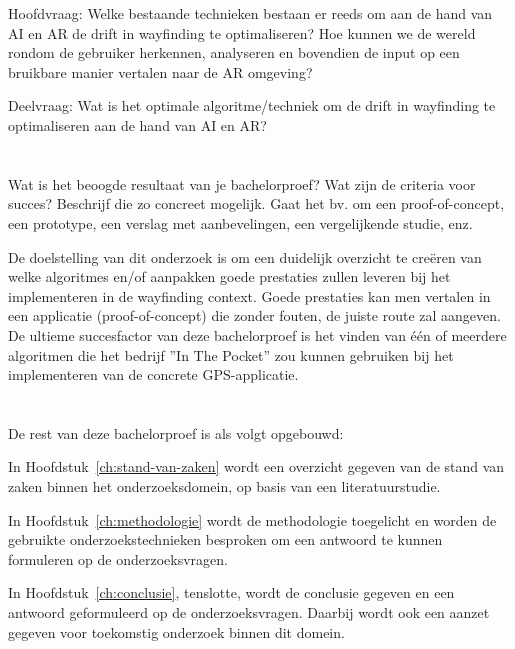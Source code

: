 Hoofdvraag: Welke bestaande technieken bestaan er reeds om aan de hand van AI en AR de drift in wayfinding te optimaliseren? Hoe kunnen we de wereld rondom de gebruiker herkennen, analyseren en bovendien de input op een bruikbare manier vertalen naar de AR omgeving?

Deelvraag: Wat is het optimale algoritme/techniek om de drift in wayfinding te optimaliseren aan de hand van AI en AR? 

\section{}
\label{sec:onderzoeksdoelstelling}

Wat is het beoogde resultaat van je bachelorproef? Wat zijn de criteria voor succes? Beschrijf die zo concreet mogelijk. Gaat het bv. om een proof-of-concept, een prototype, een verslag met aanbevelingen, een vergelijkende studie, enz.

De doelstelling van dit onderzoek is om een duidelijk overzicht te creëren van welke algoritmes en/of aanpakken goede prestaties zullen leveren bij het implementeren in de wayfinding context. Goede prestaties kan men vertalen in een applicatie (proof-of-concept) die zonder fouten, de juiste route zal aangeven.
De ultieme succesfactor van deze bachelorproef is het vinden van één of meerdere algoritmen die het bedrijf ''In The Pocket'' zou kunnen gebruiken bij het implementeren van de concrete GPS-applicatie.



\section{}
\label{sec:opzet-bachelorproef}


De rest van deze bachelorproef is als volgt opgebouwd:

In Hoofdstuk~\ref{ch:stand-van-zaken} wordt een overzicht gegeven van de stand van zaken binnen het onderzoeksdomein, op basis van een literatuurstudie.

In Hoofdstuk~\ref{ch:methodologie} wordt de methodologie toegelicht en worden de gebruikte onderzoekstechnieken besproken om een antwoord te kunnen formuleren op de onderzoeksvragen.


In Hoofdstuk~\ref{ch:conclusie}, tenslotte, wordt de conclusie gegeven en een antwoord geformuleerd op de onderzoeksvragen. Daarbij wordt ook een aanzet gegeven voor toekomstig onderzoek binnen dit domein.